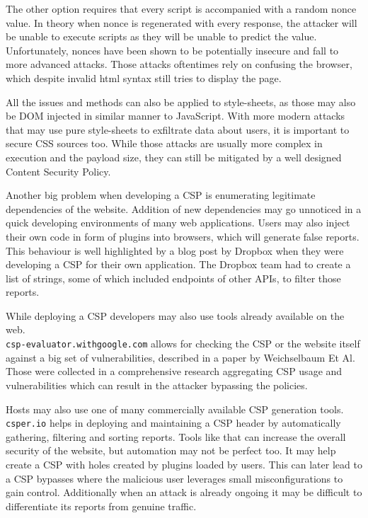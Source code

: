 The other option requires that every script is accompanied with a random nonce value.
In theory when nonce is regenerated with every response, the attacker will be unable to execute scripts as they will be unable to predict the value.
Unfortunately, nonces have been shown to be potentially insecure and fall to more advanced attacks. \cite{noncesGoBrrr}
Those attacks oftentimes rely on confusing the browser, which despite invalid html syntax still tries to display the page.

All the issues and methods can also be applied to style-sheets, as those may also be DOM injected in similar manner to JavaScript. \cite{cssinjection} \cite{cssexfil}
With more modern attacks that may use pure style-sheets to exfiltrate data about users, it is important to secure CSS sources too.
While those attacks are usually more complex in execution and the payload size, they can still be mitigated by a well designed Content Security Policy.

Another big problem when developing a CSP is enumerating legitimate dependencies of the website.
Addition of new dependencies may go unnoticed in a quick developing environments of many web applications.
Users may also inject their own code in form of plugins into browsers, which will generate false reports.
This behaviour is well highlighted by a blog post by Dropbox when they were developing a CSP for their own application. \cite{dropboxcsp}
The Dropbox team had to create a list of strings, some of which included endpoints of other APIs, to filter those reports.

While deploying a CSP developers may also use tools already available on the web. \\ 
\texttt{csp-evaluator.withgoogle.com} allows for checking the CSP or the website itself against a big set of vulnerabilities, described in a paper by Weichselbaum Et Al. \cite{weichselbaum2016csp}
Those were collected in a comprehensive research aggregating CSP usage and vulnerabilities which can result in the attacker bypassing the policies.

Hosts may also use one of many commercially available CSP generation tools.
\texttt{csper.io} helps in deploying and maintaining a CSP header by automatically gathering, filtering and sorting reports. 
Tools like that can increase the overall security of the website, but automation may not be perfect too. 
It may help create a CSP with holes created by plugins loaded by users.
This can later lead to a CSP bypasses where the malicious user leverages small misconfigurations to gain control.
Additionally when an attack is already ongoing it may be difficult to differentiate its reports from genuine traffic.

